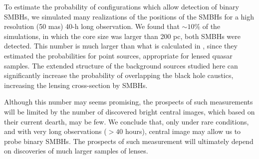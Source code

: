\documentclass[chicago]{emulateapj}
\begin{document}



To estimate the probability of configurations which allow detection of binary SMBHs, we simulated many realizations of the positions of the SMBHs for a high resolution (50 mas) 40-h long observation. 
We found that $\sim10\%$ of the simulations, in which the core size was larger than 200 pc, both SMBHs were detected. 
This number is much larger than what is calculated in \citet{Li:12}, since they estimated  the probabilities for point sources, appropriate for lensed quasar samples. The extended structure of the background sources studied here can significantly increase the probability of overlapping the black hole caustics, increasing the lensing cross-section by SMBHs.

  Although this number may seems promising, the prospects of such measurements will be limited by the number of discovered bright central images, which based on their current dearth, may be few. We conclude that, only under rare conditions, and with very long observations ($>40$ hours), central image may allow us to probe binary SMBHs. The prospects of such measurement will ultimately depend on discoveries of much larger samples of lenses.

\end{document}
